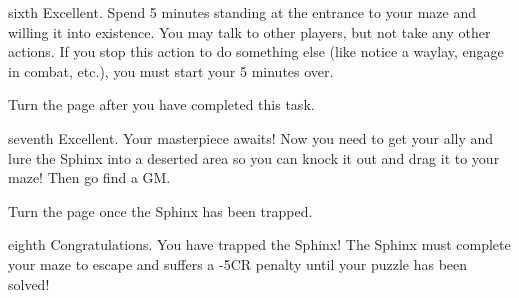 \documentclass[notebook]{guildcamp2} %
\begin{document}
\begin{page}{sixth}
Excellent. Spend 5 minutes standing at the entrance to your maze and willing it into existence. You may talk to other players, but not take any other actions. If you stop this action to do something else (like notice a waylay, engage in combat, etc.), you must start your 5 minutes over.

Turn the page after you have completed this task.
\end{page}

\begin{page}{seventh}
Excellent. Your masterpiece awaits! Now you need to get your ally and lure the Sphinx into a deserted area so you can knock it out and drag it to your maze! Then go find a GM.

Turn the page once the Sphinx has been trapped.
\end{page}

\begin{page}{eighth}
Congratulations. You have trapped the Sphinx! The Sphinx must complete your maze to escape and suffers a -5CR penalty until your puzzle has been solved!
\end{page}

\endnotebook
\end{document}
